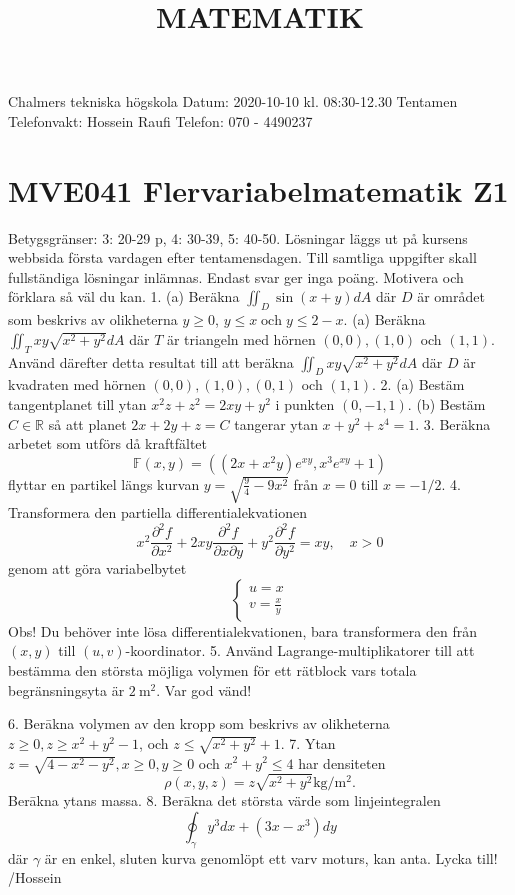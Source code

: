 \title{
MATEMATIK
}
Chalmers tekniska högskola
Datum: 2020-10-10 kl. 08:30-12.30
Tentamen
Telefonvakt: Hossein Raufi
Telefon: 070 - 4490237
\section*{MVE041 Flervariabelmatematik Z1}
Betygsgränser: 3: 20-29 p, 4: 30-39, 5: 40-50.
Lösningar läggs ut på kursens webbsida första vardagen efter tentamensdagen.
Till samtliga uppgifter skall fullständiga lösningar inlämnas. Endast svar ger inga poäng. Motivera och förklara så väl du kan.
1. (a) Beräkna \(\iint_{D} \sin (x+y) d A\) där \(D\) är området som beskrivs av olikheterna \(y \geq 0\), \(y \leq x \operatorname{och} y \leq 2-x\).
(a) Beräkna \(\iint_{T} x y \sqrt{x^{2}+y^{2}} d A\) där \(T\) är triangeln med hörnen \((0,0),(1,0)\) och \((1,1)\). Använd därefter detta resultat till att beräkna \(\iint_{D} x y \sqrt{x^{2}+y^{2}} d A\) där \(D\) är kvadraten med hörnen \((0,0),(1,0),(0,1)\) och \((1,1)\).
2. (a) Bestäm tangentplanet till ytan \(x^{2} z+z^{2}=2 x y+y^{2}\) i punkten \((0,-1,1)\).
(b) Bestäm \(C \in \mathbb{R}\) så att planet \(2 x+2 y+z=C\) tangerar ytan \(x+y^{2}+z^{4}=1\).
3. Beräkna arbetet som utförs då kraftfältet
\[
\mathbb{F}(x, y)=\left((2 x+x^{2} y) e^{x y}, x^{3} e^{x y}+1\right)
\]
flyttar en partikel längs kurvan \(y=\sqrt{\frac{9}{4}-9 x^{2}}\) från \(x=0\) till \(x=-1 / 2\).
4. Transformera den partiella differentialekvationen
\[
x^{2} \frac{\partial^{2} f}{\partial x^{2}}+2 x y \frac{\partial^{2} f}{\partial x \partial y}+y^{2} \frac{\partial^{2} f}{\partial y^{2}}=x y, \quad x>0
\]
genom att göra variabelbytet
\[
\left\{\begin{array}{l}
u=x \\
v=\frac{x}{y}
\end{array}\right.
\]
Obs! Du behöver inte lösa differentialekvationen, bara transformera den från \((x, y)\) till \((u, v)\)-koordinator.
5. Använd Lagrange-multiplikatorer till att bestämma den största möjliga volymen för ett rätblock vars totala begränsningsyta är \(2 \mathrm{~m}^{2}\).
Var god vänd!

6. Berākna volymen av den kropp som beskrivs av olikheterna \(z \geq 0, z \geq x^{2}+y^{2}-1\), och \(z \leq \sqrt{x^{2}+y^{2}}+1\).
7. Ytan \(z=\sqrt{4-x^{2}-y^{2}}, x \geq 0, y \geq 0\) och \(x^{2}+y^{2} \leq 4\) har densiteten
\[
\rho(x, y, z)=z \sqrt{x^{2}+y^{2}} \mathrm{kg} / \mathrm{m}^{2} .
\]
Berākna ytans massa.
8. Berākna det största värde som linjeintegralen
\[
\oint_{\gamma} y^{3} d x + \left(3 x-x^{3}\right) d y
\]
där \(\gamma\) är en enkel, sluten kurva genomlöpt ett varv moturs, kan anta.
Lycka till!
/Hossein